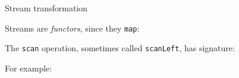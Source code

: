 \begin{frame}[fragile]{Stream transformation}
\protect\hypertarget{stream-transformation}{}

Streams are \emph{functors}, since they \texttt{map}:

\begin{Shaded}
\begin{Highlighting}[]
\end{Highlighting}
\end{Shaded}

The \texttt{scan} operation, sometimes called \texttt{scanLeft}, has
signature:

\begin{Shaded}
\begin{Highlighting}[]
\end{Highlighting}
\end{Shaded}

For example:

\begin{Shaded}
\begin{Highlighting}[]
\NormalTok{(}\NormalTok{)(_ + }\NormalTok{)}
\NormalTok{ (_ * }\NormalTok{)}
\NormalTok{(}\NormalTok{(}\NormalTok{)}
\end{Highlighting}
\end{Shaded}

\end{frame}

